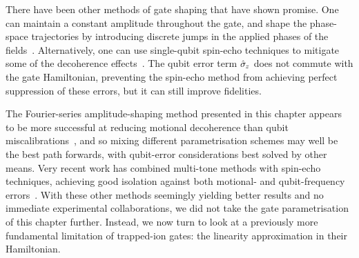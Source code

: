 There have been other methods of gate shaping that have shown promise.
One can maintain a constant amplitude throughout the gate, and shape the phase-space trajectories by introducing discrete jumps in the applied phases of the fields~\cite{Milne2020}.
Alternatively, one can use single-qubit spin-echo techniques to mitigate some of the decoherence effects~\cite{Manovitz2017}.
The qubit error term $\hat{\sigma}_{\mkern-1mu z}$ does not commute with the gate Hamiltonian, preventing the spin-echo method from achieving perfect suppression of these errors, but it can still improve fidelities.

The Fourier-series amplitude-shaping method presented in this chapter appears to be more successful at reducing motional decoherence than qubit miscalibrations~\cite{Webb2018,Shapira2018}, and so mixing different parametrisation schemes may well be the best path forwards, with qubit-error considerations best solved by other means.
Very recent work has combined multi-tone methods with spin-echo techniques, achieving good isolation against both motional- and qubit-frequency errors~\cite{Manovitz2022}.
With these other methods seemingly yielding better results and no immediate experimental collaborations, we did not take the gate parametrisation of this chapter further.
Instead, we now turn to look at a previously more fundamental limitation of trapped-ion gates: the linearity approximation in their Hamiltonian.
